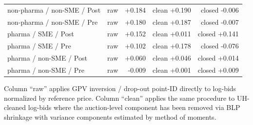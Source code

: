 \begin{table}[htbp]
\begin{threeparttable}
{\begin{tabular}{llllrrr}
\multicolumn{3}{l}{non-pharma / non-SME / Post} & raw & +0.184 & clean +0.190 & closed -0.006 \\
\multicolumn{3}{l}{non-pharma / non-SME / Pre} & raw & +0.180 & clean +0.187 & closed -0.007 \\
\multicolumn{3}{l}{pharma / SME / Post} & raw & +0.152 & clean +0.011 & closed +0.141 \\
\multicolumn{3}{l}{pharma / SME / Pre} & raw & +0.102 & clean +0.178 & closed -0.076 \\
\multicolumn{3}{l}{pharma / non-SME / Post} & raw & +0.060 & clean +0.046 & closed +0.014 \\
\multicolumn{3}{l}{pharma / non-SME / Pre} & raw & -0.009 & clean +0.001 & closed +0.009 \\
\bottomrule
\end{tabular}}
\begin{tablenotes}\footnotesize
\item Column ``raw'' applies GPV inversion / drop-out point-ID
directly to log-bids normalized by reference price. Column
``clean'' applies the same procedure to UH-cleaned log-bids where
the auction-level component has been removed via BLP shrinkage
with variance components estimated by method of moments.
\end{tablenotes}
\end{threeparttable}
\end{table}
